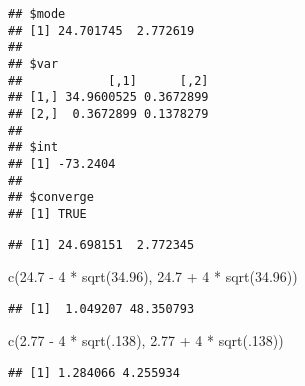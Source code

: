 \documentclass[
]{book}
\newenvironment{Shaded}{\begin{snugshade}}{\end{snugshade}}
\newcommand{\AttributeTok}[1]{\textcolor[rgb]{0.77,0.63,0.00}{#1}}
\newcommand{\DecValTok}[1]{\textcolor[rgb]{0.00,0.00,0.81}{#1}}
\newcommand{\FloatTok}[1]{\textcolor[rgb]{0.00,0.00,0.81}{#1}}
\newcommand{\FunctionTok}[1]{\textcolor[rgb]{0.00,0.00,0.00}{#1}}
\newcommand{\NormalTok}[1]{#1}
\newcommand{\SpecialCharTok}[1]{\textcolor[rgb]{0.00,0.00,0.00}{#1}}
\newcommand{\StringTok}[1]{\textcolor[rgb]{0.31,0.60,0.02}{#1}}
\begin{document}
\begin{verbatim}
## $mode
## [1] 24.701745  2.772619
## 
## $var
##            [,1]      [,2]
## [1,] 34.9600525 0.3672899
## [2,]  0.3672899 0.1378279
## 
## $int
## [1] -73.2404
## 
## $converge
## [1] TRUE
\end{verbatim}

\begin{Shaded}
\end{Shaded}

\begin{verbatim}
## [1] 24.698151  2.772345
\end{verbatim}

\begin{Shaded}
\begin{Highlighting}[]
\FunctionTok{c}\NormalTok{(}\FloatTok{24.7} \SpecialCharTok{{-}} \DecValTok{4} \SpecialCharTok{*} \FunctionTok{sqrt}\NormalTok{(}\FloatTok{34.96}\NormalTok{), }\FloatTok{24.7} \SpecialCharTok{+} \DecValTok{4} \SpecialCharTok{*} \FunctionTok{sqrt}\NormalTok{(}\FloatTok{34.96}\NormalTok{))}
\end{Highlighting}
\end{Shaded}

\begin{verbatim}
## [1]  1.049207 48.350793
\end{verbatim}

\begin{Shaded}
\begin{Highlighting}[]
\FunctionTok{c}\NormalTok{(}\FloatTok{2.77} \SpecialCharTok{{-}} \DecValTok{4} \SpecialCharTok{*} \FunctionTok{sqrt}\NormalTok{(.}\DecValTok{138}\NormalTok{), }\FloatTok{2.77} \SpecialCharTok{+} \DecValTok{4} \SpecialCharTok{*} \FunctionTok{sqrt}\NormalTok{(.}\DecValTok{138}\NormalTok{))}
\end{Highlighting}
\end{Shaded}

\begin{verbatim}
## [1] 1.284066 4.255934
\end{verbatim}

\begin{Shaded}
\end{Shaded}
\end{document}
